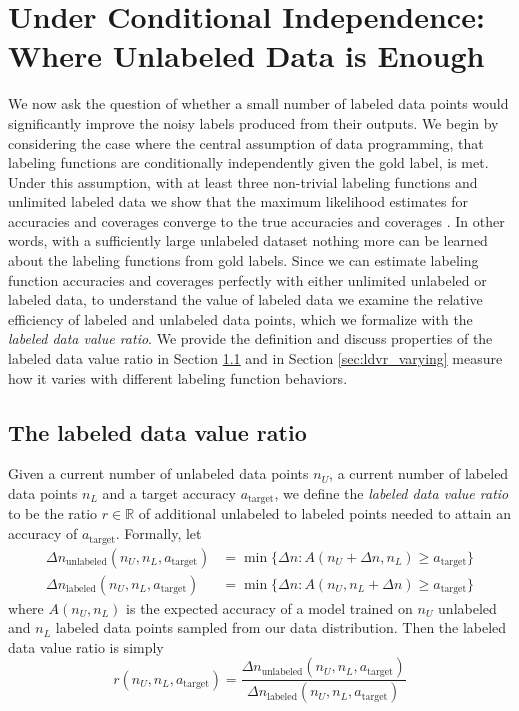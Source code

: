\section{Under Conditional Independence: Where Unlabeled Data is Enough}

We now ask the question of whether a small number of labeled data points would significantly improve the noisy labels produced from their outputs. We begin by considering the case where the central assumption of data programming, that labeling functions are conditionally independently given the gold label, is met. Under this assumption, with at least three non-trivial  labeling functions and unlimited labeled data we show that the maximum likelihood estimates for accuracies and coverages converge to the true accuracies and coverages . In other words, with a sufficiently large unlabeled dataset nothing more can be learned about the labeling functions from gold labels. Since we can estimate labeling function accuracies and coverages perfectly with either unlimited unlabeled or labeled data, to understand the value of labeled data we examine the relative efficiency of labeled and unlabeled data points, which we formalize with the \textit{labeled data value ratio}. We provide the definition and discuss properties of the labeled data value ratio in Section \ref{sec:ldvr} and in Section \ref{sec:ldvr_varying} measure how it varies with different labeling function behaviors.

\subsection{The labeled data value ratio}
\label{sec:ldvr}

Given a current number of unlabeled data points $n_U$, a current number of labeled data points $n_L$ and a target accuracy $a_\text{target}$, we define the \textit{labeled data value ratio} to be the ratio $r\in\mathbb{R}$ of additional unlabeled to labeled points needed to attain an accuracy of $a_\text{target}$. Formally, let
\begin{align}
    \Delta n_\text{unlabeled}(n_U,n_L,a_\text{target})&=\min\{\Delta n:A(n_U+\Delta n,n_L)\geq a_\text{target}\}\\
    \Delta n_\text{labeled}(n_U,n_L,a_\text{target})&=\min\{\Delta n:A(n_U,n_L+\Delta n)\geq a_\text{target}\}
\end{align}
where $A(n_U,n_L)$ is the expected accuracy of a model trained on $n_U$ unlabeled and $n_L$ labeled data points sampled from our data distribution. Then the labeled data value ratio is simply
\begin{equation}
    r(n_U,n_L,a_\text{target})=\frac{\Delta n_\text{unlabeled}(n_U,n_L,a_\text{target})}{\Delta n_\text{labeled}(n_U,n_L,a_\text{target})}
\end{equation}

